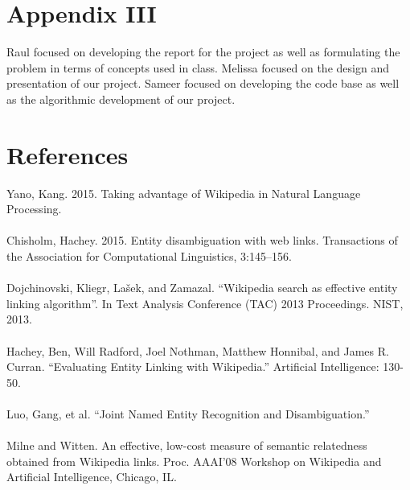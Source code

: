 \documentclass[twoside,11pt]{article}
\begin{document}
\section{Appendix III}
Raul focused on developing the report for the project as well as formulating the problem in terms of concepts used in class. Melissa focused on the design and presentation of our project. Sameer focused on developing the code base as well as the algorithmic development of our project.
\section{References}
Yano, Kang. 2015. Taking advantage of Wikipedia in Natural Language Processing.
\\ \\
Chisholm, Hachey. 2015. Entity disambiguation with web links. Transactions of the Association for Computational Linguistics, 3:145–156.
\\ \\
Dojchinovski, Kliegr, Lašek, and Zamazal. ``Wikipedia search as effective entity linking algorithm''. In Text Analysis Conference (TAC) 2013 Proceedings. NIST, 2013.
\\ \\
Hachey, Ben, Will Radford, Joel Nothman, Matthew Honnibal, and James R. Curran. ``Evaluating Entity Linking with Wikipedia.'' Artificial Intelligence: 130-50.
\\ \\
Luo, Gang, et al. ``Joint Named Entity Recognition and Disambiguation.''
\\ \\
Milne and Witten. An effective, low-cost measure of semantic relatedness obtained from Wikipedia links. Proc. AAAI’08 Workshop on Wikipedia and Artificial Intelligence, Chicago, IL.
\end{document}
